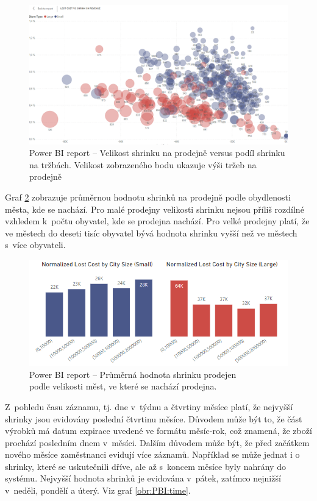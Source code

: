 \begin{figure}[h!]
    \centering
    \captionsetup{justification=centering}
    \includegraphics[width=\textwidth]{obrazky/PBI/porovnaniprodejen.png}
    \caption{Power BI report -- Velikost shrinku na prodejně versus podíl shrinku\\ na tržbách. Velikost zobrazeného bodu ukazuje výši tržeb na prodejně}
    \label{obr:PBI:porovnani}
\end{figure}

Graf \ref*{obr:PBI:velikost} zobrazuje průměrnou hodnotu shrinků na prodejně podle obydlenosti města, kde se nachází. Pro malé prodejny velikosti shrinku nejsou příliš rozdílné vzhledem k~počtu obyvatel, kde se prodejna nachází. Pro velké prodejny platí, že ve městech do deseti tisíc obyvatel bývá hodnota shrinku vyšší než ve  městech s~více obyvateli.

\begin{figure}[h!]
    \centering
    \captionsetup{justification=centering}
    \includegraphics[width=.8\textwidth]{obrazky/PBI/citysize.png}
    \caption{Power BI report -- Průměrná hodnota shrinku prodejen \\ podle velikosti měst, ve které se nachází prodejna.}
    \label{obr:PBI:velikost}
\end{figure}

Z~pohledu času záznamu, tj. dne v~týdnu a čtvrtiny měsíce platí, že nejvyšší shrinky jsou evidovány poslední čtvrtinu měsíce. Důvodem může být to, že část výrobků má datum expirace uvedené ve formátu měsíc-rok, což znamená, že zboží prochází posledním dnem v~měsíci. Dalším důvodem může být, že před začátkem nového měsíce zaměstnanci  evidují více záznamů. Například se může jednat i o shrinky, které se uskutečnili dříve, ale až s~koncem měsíce byly nahrány do systému. Nejvyšší hodnota shrinků je evidována v~pátek, zatímco nejnižší v~neděli, pondělí a úterý. Viz graf \ref*{obr:PBI:time}.

